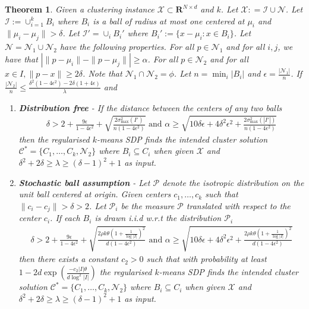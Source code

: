 \documentclass[12pt]{article}
\newcommand{\mc}{\mathcal}
\newcommand{\mb}{\mathbf}
\newtheorem{theorem}{Theorem}
\begin{document}
\begin{theorem}
\label{thm:regularisedSDPGeneral}
Given a clustering instance $\mc X \subset \mb R^{N \times d}$ and $k$. Let $\mc X : = \mc I \cup \mc N$. Let $\mc I := \cup_{i=1}^k B_i$ where $B_i$ is a ball of radius at most one centered at $\mu_i$ and $\|\mu_i - \mu_j\| > \delta$. Let $\mc I' = \cup_i B_i'$ where $B_i' := \{x - \mu_i : x \in B_i\}$.  Let $\mc N = \mc N_1 \cup \mc N_2$ have the following properties. For all $p \in \mc N_1$ and for all $i, j$, we have that $| \|p- \mu_i\| - \|p- \mu_j\|| \ge \alpha$. For all $p \in \mc N_2$ and for all $x \in I, \|p - x\| \ge 2\delta$. Note that $\mc N_1 \cap \mc N_2 = \phi$. Let $n = \min_i |B_i|$ and $\epsilon = \frac{|\mc N_1|}{n}$. If $\frac{|\mc N_2|}{n} \le \frac{\delta^2(1-4\epsilon^2)-2\delta(1+4\epsilon)}{\lambda}$ and 
\begin{enumerate}[leftmargin=*,nolistsep,noitemsep]
	\item \textbf{Distribution free} - If  the distance between the centers of any two balls
	\begin{align*}
		\delta > 2 + \frac{9\epsilon}{1-4\epsilon^2} + \sqrt{\frac{2\sigma_{\max}^2(I')}{n(1-4\epsilon^2)}} \text{ and }
		\alpha \ge \sqrt{10\delta \epsilon + 4\delta^2 \epsilon^2+ \frac{2\sigma_{\max}^2(|I'|)}{n(1-4\epsilon^2)}}
	\end{align*} 
	then the regularised $k$-means SDP finds the intended cluster solution  $\mc C^* = \{C_1, \ldots, C_k, \mc N_2\}$ where $B_i \subseteq C_i$ when given $\mc X$ and $\delta^2+2\delta \ge \lambda \ge (\delta-1)^2 + 1$ as input.
	\item  \textbf{Stochastic ball assumption} - Let $\mc P$ denote the isotropic distribution on the unit ball centered at origin. Given centers $c_1, \ldots, c_k$ such that $\|c_i - c_j\| > \delta > 2$. Let $\mc P_i$ be the measure $\mc P$ translated with respect to the center $c_i$. If each $B_i$ is drawn i.i.d w.r.t the distribution $\mc P_i$ 
	\begin{align*}
	   \delta > 2 + \frac{9\epsilon}{1-4\epsilon^2} + \sqrt{\frac{2\rho k\theta(1+\frac{1}{\log|I|})^2}{d(1-4\epsilon^2)}} \text{ and }
	  \alpha \ge \sqrt{10\delta \epsilon + 4\delta^2 \epsilon^2+ \frac{2\rho k\theta(1+\frac{1}{\log|I|})^2}{d(1-4\epsilon^2)}}
	\end{align*}
	then there exists a constant $c_2 > 0$ such that with probability at least $1 - 2d\exp(\frac{-c_2|I|\theta}{d\log^2|I|})$ the regularised $k$-means SDP finds the intended cluster solution  $\mc C^* = \{C_1, \ldots, C_k, \mc N_2\}$ where $B_i \subseteq C_i$ when given $\mc X$ and $\delta^2+2\delta \ge \lambda \ge (\delta-1)^2 + 1$ as input.
\end{enumerate}
\end{theorem}
\end{document}
